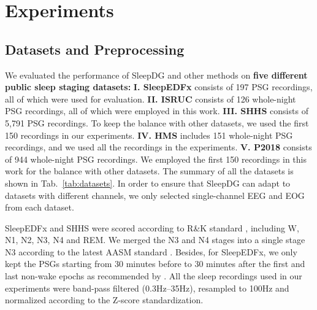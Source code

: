 \documentclass[letterpaper]{article} %
\begin{document}
	\section{Experiments}
	\subsection{Datasets and Preprocessing}
	
	We evaluated the performance of SleepDG and other methods on \textbf{five different public sleep staging datasets:}
	\textbf{I. SleepEDFx} \citep{Kemp2000AnalysisOA, Goldberger2000PhysioBankPA} consists of 197 PSG recordings, all of which were used for evaluation.
	\textbf{II. ISRUC} \citep{khalighi2016isruc} consists of 126 whole-night PSG recordings, all of which were employed in this work.
	\textbf{III. SHHS} \citep{zhang2018national, quan1997sleep} consists of 5,791 PSG recordings.
	To keep the balance with other datasets, we used the first 150 recordings in our experiments.
	\textbf{IV. HMS} \citep{alvarez2021inter} includes 151 whole-night PSG recordings, and we used all the recordings in the experiments.
	\textbf{V. P2018} \citep{ghassemi2018you} consists of 944 whole-night PSG recordings.
	We employed the first 150 recordings in this work for the balance with other datasets.
	The summary of all the datasets is shown in Tab.~\ref{tab:datasets}.
	In order to ensure that SleepDG can adapt to datasets with different channels, we only selected single-channel EEG and EOG from each dataset.
	
	SleepEDFx and SHHS were scored according to R\&K standard \citep{Wolpert1969AMO}, including W, N1, N2, N3, N4 and REM.
	We merged the N3 and N4 stages into a single stage N3 according to the latest AASM standard \citep{Iber2007TheAA}. 
	Besides, for SleepEDFx, we only kept the PSGs starting from 30 minutes before to 30 minutes after the first and last non-wake epochs as recommended by \citet{Supratak2017DeepSleepNetAM}.
	All the sleep recordings used in our experiments were band-pass filtered (0.3Hz--35Hz), resampled to 100Hz and normalized according to the Z-score standardization.
	
	
	
\end{document}
